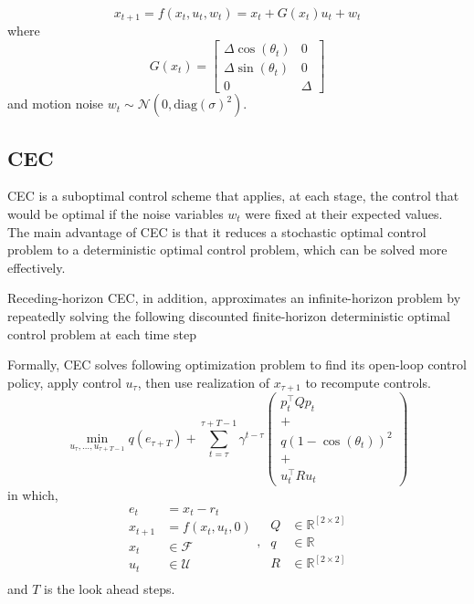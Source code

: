\documentclass[conference]{IEEEtran}
\begin{document}
\[
{x}_{t+1} = {f}({x}_t, {u}_t, {w}_t) = {x}_t + {G}({x}_t) {u}_t + {w}_t
\]
where
\[
{G}({x}_t) = \begin{bmatrix}
\Delta \cos(\theta_t) & 0 \\
\Delta \sin(\theta_t) & 0 \\
0 & \Delta 
\end{bmatrix}
\]
and motion noise \( {w}_t \sim \mathcal{N}(0, \mathrm{diag}(\sigma)^2) \).

\subsection{CEC}
CEC is a suboptimal control scheme that applies, at each stage, 
the control that would be optimal
if the noise variables $w_t$ were fixed at their expected values. 
The main advantage of CEC is that it reduces 
a stochastic optimal control problem to a deterministic optimal control problem, 
which can be solved more effectively. 

Receding-horizon CEC, in addition, 
approximates an infinite-horizon problem by repeatedly solving the following discounted finite-horizon
deterministic optimal control problem at each time step

Formally, CEC solves following optimization problem to find its open-loop control policy, 
apply control $u_\tau$, then use realization of $x_{\tau+1}$ to recompute controls.
\[
\min_{{u}_\tau, \ldots, {u}_{\tau+T-1}} 
q({e}_{\tau+T}) + 
\sum_{t=\tau}^{\tau+T-1} \gamma^{t-\tau} 
\left( 
    \begin{gathered}
        {p}_t^\top Q {p}_t  \\ 
        +\\
        q(1 - \cos(\theta_t))^2 \\
        +\\
        {u}_t^\top R {u}_t 
    \end{gathered} 
\right)
\]
in which,
\[
\begin{aligned}
{e}_{t} 
    &= x_{t} - r_{t} \\
x_{t+1} 
    &= f({x}_t, {u}_t, {0}) \\
{x}_t 
    &\in \mathcal{F} \\
{u}_t
    &\in \mathcal{U} \\
\end{aligned},\ 
\begin{aligned}
    Q &\in \mathbb{R}^{[2\times 2]} \\
    q &\in \mathbb{R} \\
    R &\in \mathbb{R}^{[2\times 2]}
\end{aligned}
\]
and $T$ is the look ahead steps.
\end{document}
